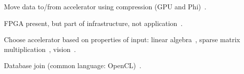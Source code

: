 Move data to/from accelerator using compression (GPU and Phi)~\cite{bkp15}.

FPGA present, but part of infrastructure, not application~\cite{abb+13}.

Choose accelerator based on properties of input:
linear algebra~\cite{gchg16,sll+13},
sparse matrix multiplication~\cite{gsbh16},
vision~\cite{mfo+16}.


Database join (common language: OpenCL)~\cite{rl17}.




